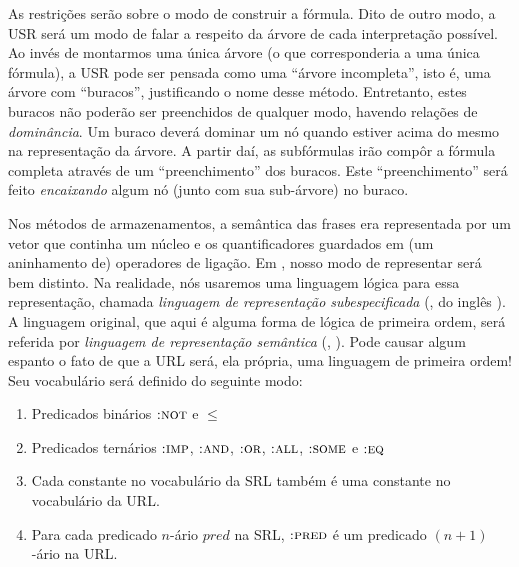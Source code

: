 \begin{center}
\end{center}

As restrições serão sobre o modo de construir a fórmula. Dito de outro modo, a USR será um modo de falar a respeito da árvore de cada interpretação possível. Ao invés de montarmos uma única árvore (o que corresponderia a uma única fórmula), a USR pode ser pensada como uma ``árvore incompleta'', isto é, uma árvore com ``buracos'', justificando o nome desse método. Entretanto, estes buracos não poderão ser preenchidos de qualquer modo, havendo relações de \textit{dominância}. Um buraco deverá dominar um nó quando estiver acima do mesmo na representação da árvore. A partir daí, as subfórmulas irão compôr a fórmula completa através de um ``preenchimento'' dos buracos. Este ``preenchimento'' será feito \textit{encaixando} algum nó (junto com sua sub-árvore) no buraco.

Nos métodos de armazenamentos, a semântica das frases era representada por um vetor que continha um núcleo e os quantificadores guardados em (um aninhamento de) operadores de ligação. Em , nosso modo de representar será bem distinto. Na realidade, nós usaremos uma linguagem lógica para essa representação, chamada \textit{linguagem de representação subespecificada} (, do inglês ). A linguagem original, que aqui é alguma forma de lógica de primeira ordem, será referida por \textit{linguagem de representação semântica} (, ). Pode causar algum espanto o fato de que a URL será, ela própria, uma linguagem de primeira ordem! Seu vocabulário será definido do seguinte modo:

\begin{enumerate}
\item Predicados binários $\textsc{:not}$ e $\leq$
\item Predicados ternários $\textsc{:imp}$, $\textsc{:and}$, $\textsc{:or}$, $\textsc{:all}$, $\textsc{:some}$ e $\textsc{:eq}$
\item Cada constante no vocabulário da SRL também é uma constante no vocabulário da URL.
\item Para cada predicado $n$-ário $pred$ na SRL, $\textsc{:pred}$ é um predicado $(n+1)$-ário na URL.
\end{enumerate}

